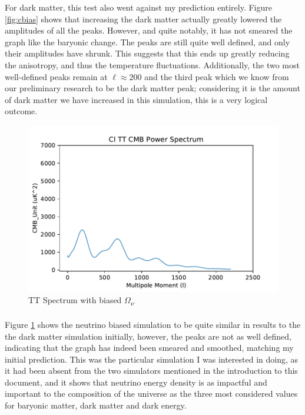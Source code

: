 \documentclass[twoside, fontsize=12pt,
     bibliography=totoc, %
     listof=totoc, %
     index=totoc, %
     onehalfspacing %
]{_MScDiss2017_cls}
\begin{document}
For dark matter, this test also went against my prediction entirely. Figure \ref{fig:cbias} shows that increasing the dark matter actually greatly lowered the amplitudes of all the peaks. However, and quite notably, it has not smeared the graph like the baryonic change. The peaks are still quite well defined, and only their amplitudes have shrunk. This suggests that this ends up greatly reducing the anisotropy, and thus the temperature fluctuations. Additionally, the two most well-defined peaks remain at $\ell$$\approx$200 and the third peak which we know from our preliminary research to be the dark matter peak; considering it is the amount of dark matter we have increased in this simulation, this is a very logical outcome.

\begin{figure}
	\begin{center}
	\includegraphics{5Cl-TT-vs-l}
	\caption{TT Spectrum with biased $\Omega$\textsubscript{$\nu$}}
	\label{fig:vbias}
	\end{center}
\end{figure}

\paragraph{}

Figure \ref{fig:vbias} shows the neutrino biased simulation to be quite similar in results to the the dark matter simulation initially, however, the peaks are not as well defined, indicating that the graph has indeed been smeared and smoothed, matching my initial prediction. This was the particular simulation I was interested in doing, as it had been absent from the two simulators mentioned in the introduction to this document, and it shows that neutrino energy density is as impactful and important to the composition of the universe as the three most considered values for baryonic matter, dark matter and dark energy.
\end{document}
